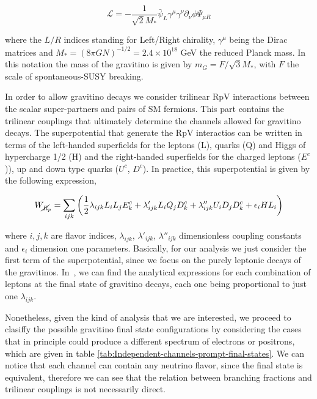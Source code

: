 \documentclass[a4paper,11pt]{article}
\begin{document}
\begin{equation}
  \mathcal{L} = −\frac{1}{\sqrt{2}M_*}\bar{\psi}_L\gamma^\mu\gamma^\nu\partial_\nu\phi\Psi_{\mu R}
\end{equation}

\noindent where the $L/R$ indices standing for Left/Right chirality, $\gamma^\mu$ being the Dirac matrices and $M_* = (8\pi G N)^{-1/2} = 2.4\times 10^{18}$ GeV the reduced Planck mass. In this notation the mass of the gravitino is given by $m_G = F/\sqrt{3}M_*$, with $F$ the scale of spontaneous-SUSY breaking.

In order to allow gravitino decays we consider trilinear RpV interactions between the scalar super-partners and pairs of SM fermions. This part contains the trilinear couplings that ultimately determine the channels allowed for gravitino decays. The superpotential that generate the RpV interactios can be written in terms of the left-handed superfields for the leptons (L), quarks (Q) and Higgs of hypercharge 1/2 (H) and the right-handed superfields for the charged leptons ($E^c$)), up and down type quarks ($U^c$, $D^c$). In practice, this superpotential is given by the following expression,

\begin{equation}
 W_{\cancel{R}_p} = \sum_{ijk}\left(\frac{1}{2}\lambda_{ijk}L_i L_j E_k^c + \lambda'_{ijk}L_i Q_j D_k^c + \lambda''_{ijk}U_i D_j D_k^c + \epsilon_iHL_i\right)
\end{equation}

\noindent where $i,j,k$ are flavor indices, $\lambda_{ijk}$, $\lambda'_{ijk}$, $\lambda''_{ijk}$ dimensionless coupling constants and $\epsilon_i$ dimension one parameters. Basically, for our analysis we just consider the first term of the superpotential, since we focus on the purely leptonic decays of the gravitinos. In~\cite{Moreau:2001sr}, we can find the analytical expressions for each combination of leptons at the final state of gravitino decays, each one being proportional to just one $\lambda_{ijk}$. 

Nonetheless, given the kind of analysis that we are interested, we proceed to clasiffy the possible gravitino final state configurations by considering the cases that in principle could produce a different spectrum of electrons or positrons, which are given in table \ref{tab:Independent-channels-prompt-final-states}. We can notice that each channel can contain any neutrino flavor, since the final state is equivalent, therefore we can see that the relation between branching fractions and trilinear couplings is not necessarily direct.
\end{document}
